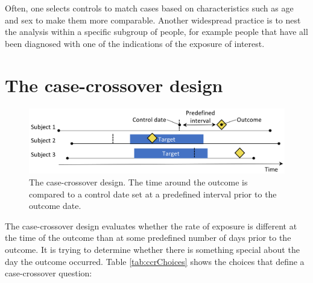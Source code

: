 \documentclass[11pt]{book}
\theoremstyle{definition}
\theoremstyle{definition}
\theoremstyle{definition}
\theoremstyle{remark}
\begin{document}
Often, one selects controls to match cases based on characteristics such as age and sex to make them more comparable. Another widespread practice is to nest the analysis within a specific subgroup of people, for example people that have all been diagnosed with one of the indications of the exposure of interest.

\hypertarget{the-case-crossover-design}{%
\section{The case-crossover design}\label{the-case-crossover-design}}

\begin{figure}

{\centering \includegraphics[width=0.9\linewidth]{images/PopulationLevelEstimation/caseCrossover} 

}

\caption{The case-crossover design. The time around the outcome is compared to a control date set at a predefined interval prior to the outcome date.}\label{fig:caseCrossover}
\end{figure}

The case-crossover \citep{maclure_1991} design evaluates whether the rate of exposure is different at the time of the outcome than at some predefined number of days prior to the outcome. It is trying to determine whether there is something special about the day the outcome occurred. Table \ref{tab:ccrChoices} shows the choices that define a case-crossover question:
\end{document}
